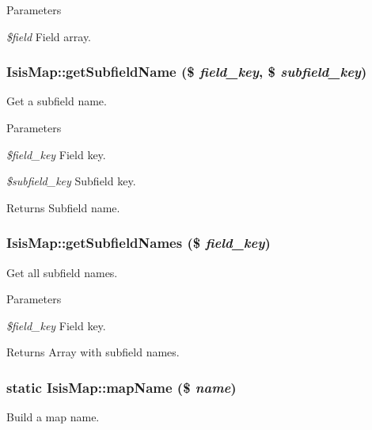 \begin{DoxyParams}{Parameters}
\item[{\em \$field}]Field array. \end{DoxyParams}
\hypertarget{classIsisMap_a83ffdd84c385513a09e5ab523a44d6f2}{
\subsubsection[{getSubfieldName}]{\setlength{\rightskip}{0pt plus 5cm}IsisMap::getSubfieldName (\$ {\em field\_\-key}, \/  \$ {\em subfield\_\-key})}}
\label{classIsisMap_a83ffdd84c385513a09e5ab523a44d6f2}
Get a subfield name.


\begin{DoxyParams}{Parameters}
\item[{\em \$field\_\-key}]Field key.\item[{\em \$subfield\_\-key}]Subfield key.\end{DoxyParams}
\begin{DoxyReturn}{Returns}
Subfield name. 
\end{DoxyReturn}
\hypertarget{classIsisMap_a1f30d131831b036271b0a1ff6d5d9d68}{
\subsubsection[{getSubfieldNames}]{\setlength{\rightskip}{0pt plus 5cm}IsisMap::getSubfieldNames (\$ {\em field\_\-key})}}
\label{classIsisMap_a1f30d131831b036271b0a1ff6d5d9d68}
Get all subfield names.


\begin{DoxyParams}{Parameters}
\item[{\em \$field\_\-key}]Field key.\end{DoxyParams}
\begin{DoxyReturn}{Returns}
Array with subfield names. 
\end{DoxyReturn}
\hypertarget{classIsisMap_a7f1b9b1cce7a02dea704a40ca85e2117}{
\subsubsection[{mapName}]{\setlength{\rightskip}{0pt plus 5cm}static IsisMap::mapName (\$ {\em name})}}
\label{classIsisMap_a7f1b9b1cce7a02dea704a40ca85e2117}
Build a map name.


